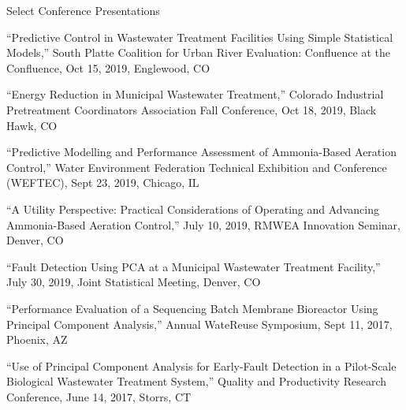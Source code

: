 \documentclass{resume} %
\begin{document}
\begin{rSection}{Select Conference Presentations}

``Predictive Control in Wastewater Treatment Facilities Using Simple Statistical Models,'' South Platte Coalition for Urban River Evaluation: Confluence at the Confluence, Oct 15, 2019, Englewood, CO

``Energy Reduction in Municipal Wastewater Treatment,'' Colorado Industrial Pretreatment Coordinators Association Fall Conference, Oct 18, 2019, Black Hawk, CO

%
``Predictive Modelling and Performance Assessment of Ammonia-Based Aeration Control,'' Water Environment Federation Technical Exhibition and Conference (WEFTEC), Sept 23, 2019, Chicago, IL

``A Utility Perspective: Practical Considerations of Operating and Advancing Ammonia-Based Aeration Control,'' July 10, 2019, RMWEA Innovation Seminar, Denver, CO

``Fault Detection Using PCA at a Municipal Wastewater Treatment Facility,'' July 30, 2019, Joint Statistical Meeting, Denver, CO

%
%
%
%
“Performance Evaluation of a Sequencing Batch Membrane Bioreactor Using Principal Component Analysis,” Annual WateReuse Symposium, Sept 11, 2017, Phoenix, AZ

“Use of Principal Component Analysis for Early-Fault Detection in a Pilot-Scale Biological Wastewater Treatment System,” Quality and Productivity Research Conference, June 14, 2017, Storrs, CT

%
%
\end{rSection}
\end{document}
